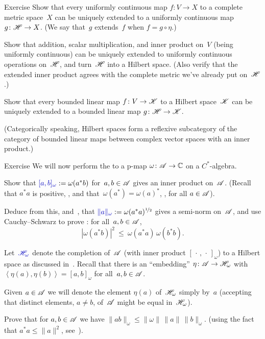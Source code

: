 \documentclass[main]{subfiles}
\begin{document}
\begin{parsec}
\begin{point}{Exercise}
Show that every uniformly continuous 
map $f\colon V\to X$ to a complete metric space~$X$
can be uniquely extended to a uniformly continuous map $g\colon \mathscr{H}\to X$.
(We say that~$g$ extends~$f$ when $f=g\circ \eta$.)

Show that addition, scalar multiplication, and inner product on~$V$
(being uniformly continuous)
can be uniquely extended to uniformly continuous operations on~$\mathscr{H}$,
and turn~$\mathscr{H}$ into a Hilbert space.
(Also verify that the extended inner product agrees with the complete
metric we've already put on~$\mathscr{H}$.)

Show that every bounded linear map $f\colon V\to\mathscr{K}$
to a Hilbert space~$\mathscr{K}$
can be uniquely extended to a bounded linear map $g\colon \mathscr{H}\to\mathscr{K}$.

(Categorically speaking,
Hilbert spaces
form a reflexive subcategory of
the category of bounded linear maps between
complex vector spaces with an inner product.)
\end{point}
\begin{point}{Exercise}%
We will now perform the 
to a p-map $\omega\colon \mathscr{A}\to\mathbb{C}$ on a $C^*$-algebra.

Show that $\Define{[a,b]_\omega} :=\omega(a^*b)$
for~$a,b\in\mathscr{A}$
gives an inner product on~$\mathscr{A}$.
(Recall that $a^*a$ is positive, ,
and that~$\omega(a^*)=\omega(a)^*$, \sref{}\TODO{}, for all $a\in \mathscr{A}$).

Deduce from this, and~, that
$\Define{\|a\|_\omega}:=\omega(a^*a)^{\nicefrac{1}{2}}$
gives a semi-norm on~$\mathscr{A}$,
and use Cauchy--Schwarz
to prove : for all~$a,b\in\mathscr{A}$,
\begin{equation*}
\left|\omega(a^*b)\right|^2\ \leq\ \omega(a^*a)\,\omega(b^*b).
\end{equation*}

Let~$\Define{\scrH_\omega}$ denote the completion
of~$\mathscr{A}$ (with inner product $[\,\cdot\,,\,\cdot\,]_\omega$)
to a Hilbert space as discussed in~.
Recall that there is an ``embedding'' $\eta\colon \mathscr{A}\to\mathscr{H}_\omega$
with $\left<\eta(a),\eta(b)\right>= [a,b]_\omega$ for all~$a,b\in \mathscr{A}$.

Given $a\in \mathscr{A}$
we will denote the element $\eta(a)$ of~$\mathscr{H}_\omega$ simply by~$a$ 
(accepting that distinct elements, $a\neq b$, of~$\mathscr{A}$ might be equal 
in~$\mathscr{H}_\omega$).

Prove that for $a,b\in \mathscr{A}$
we have $\|ab\|_\omega\leq \|\omega\|\,\|a\|\,\|b\|_\omega$.
(using the fact that $a^*a\leq \|a\|^2$, see~\TODO{}).


\end{point}
\end{parsec}
\end{document}
